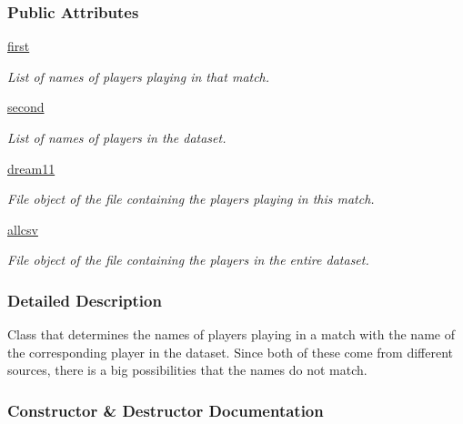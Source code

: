 \subsubsection*{Public Attributes}
\begin{DoxyCompactItemize}
\item 
\hyperlink{classname_1_1AllNames_af05034a1d261190ebd396ee615052d8e}{first}
\begin{DoxyCompactList}\small\item\em List of names of players playing in that match. \end{DoxyCompactList}\item 
\hyperlink{classname_1_1AllNames_a414e627444762afcc47ead0015f1dcce}{second}
\begin{DoxyCompactList}\small\item\em List of names of players in the dataset. \end{DoxyCompactList}\item 
\hyperlink{classname_1_1AllNames_a3fe1dd6f5e33b95faf2eca8d8dce3cc1}{dream11}
\begin{DoxyCompactList}\small\item\em File object of the file containing the players playing in this match. \end{DoxyCompactList}\item 
\hyperlink{classname_1_1AllNames_a1c94841db2dd8ff636014a0029e11673}{allcsv}
\begin{DoxyCompactList}\small\item\em File object of the file containing the players in the entire dataset. \end{DoxyCompactList}\end{DoxyCompactItemize}


\subsubsection{Detailed Description}
\begin{DoxyVerb}Class that determines the names of players playing in a match with the name of the corresponding player in the dataset. Since both of these come from different sources, there is a big possibilities that the names do not match.
\end{DoxyVerb}
 

\subsubsection{Constructor \& Destructor Documentation}
\mbox{\label{classname_1_1AllNames_ac3662eb1bdbc32f6a3baa780a8d6a18c}} 
